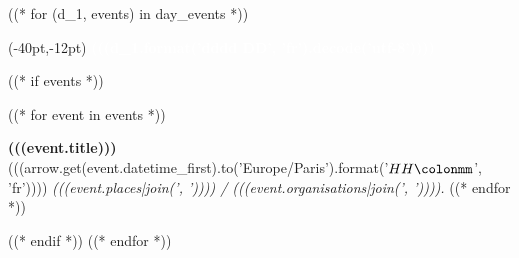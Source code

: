 \documentclass[a4paper,landscape,12pt]{article}
\newcommand{\carre}[1]{\colorbox{festif}{\textcolor{festif}{\texttt{O}}}}
\newcommand{\evenement}[4]{\textbf{#1}\\{#2 }\textit{#3 / #4.}}
\begin{document}
\pagestyle{empty}

((* for (d_1, events) in day_events *))

\begin{textblock*}{280pt}(-40pt,-12pt)
\fontsize{55}{55}\selectfont
\textcolor{white}{\textbf{(((d_1.format('dddd DD', 'fr').decode('utf-8'))))}}
\end{textblock*}
\vfill
\fontsize{32}{32}\selectfont
((* if events *))
\begin{description}
((* for event in events *))
	\item[\carre{(((event.type)))}] \evenement{(((event.title)))}{(((arrow.get(event.datetime_first).to('Europe/Paris').format('$HH\colonmm$', 'fr'))))}{(((event.places|join(', '))))}{(((event.organisations|join(', '))))}
((* endfor *))
\end{description}
((* endif *))
\vfill
\pagebreak
((* endfor *))
\end{document}
